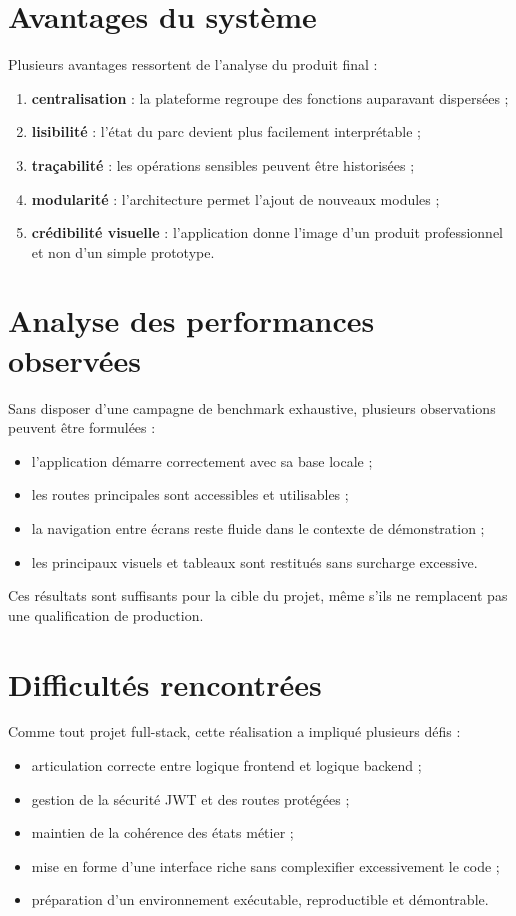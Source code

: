 \section{Avantages du système}
Plusieurs avantages ressortent de l'analyse du produit final :
\begin{enumerate}
  \item \textbf{centralisation} : la plateforme regroupe des fonctions auparavant dispersées ;
  \item \textbf{lisibilité} : l'état du parc devient plus facilement interprétable ;
  \item \textbf{traçabilité} : les opérations sensibles peuvent être historisées ;
  \item \textbf{modularité} : l'architecture permet l'ajout de nouveaux modules ;
  \item \textbf{crédibilité visuelle} : l'application donne l'image d'un produit professionnel et non d'un simple prototype.
\end{enumerate}

\section{Analyse des performances observées}
Sans disposer d'une campagne de benchmark exhaustive, plusieurs observations peuvent être formulées :
\begin{itemize}
  \item l'application démarre correctement avec sa base locale ;
  \item les routes principales sont accessibles et utilisables ;
  \item la navigation entre écrans reste fluide dans le contexte de démonstration ;
  \item les principaux visuels et tableaux sont restitués sans surcharge excessive.
\end{itemize}

Ces résultats sont suffisants pour la cible du projet, même s'ils ne remplacent pas une qualification de production.

\section{Difficultés rencontrées}
Comme tout projet full-stack, cette réalisation a impliqué plusieurs défis :
\begin{itemize}
  \item articulation correcte entre logique frontend et logique backend ;
  \item gestion de la sécurité JWT et des routes protégées ;
  \item maintien de la cohérence des états métier ;
  \item mise en forme d'une interface riche sans complexifier excessivement le code ;
  \item préparation d'un environnement exécutable, reproductible et démontrable.
\end{itemize}


